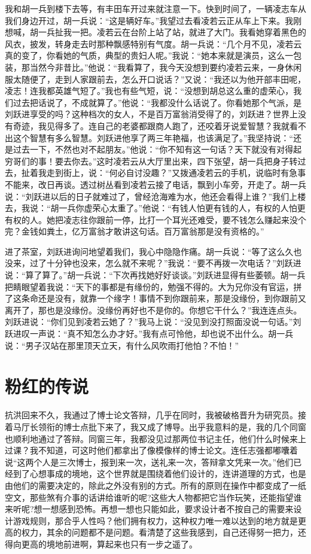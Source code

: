 \documentclass[12pt,oneside]{book}
\begin{document}
我和胡一兵到楼下去等，有丰田车开过来就注意一下。快到时间了，一辆凌志车从我们身边开过，胡一兵说：``这是辆好车。''我望过去看凌若云正从车上下来。我刚想喊，胡一兵扯我一把。凌若云在台阶上站了站，就进了大门。我看她穿着黑色的风衣，披发，转身走去时那种飘感特别有气度。胡一兵说：``几个月不见，凌若云真的变了，你看她的气质，典型的贵妇人呢。''我说：``她本来就是演员，这么一包装，那当然今非昔比。''他说：``我看算了，我今天没想到要约凌若云来，一身休闲服太随便了，走到人家跟前去，怎么开口说话？''又说：``我还以为他开部丰田呢，凌志！连我都英雄气短了。''我也有些气短，说：``没想到胡总这么重的虚荣心，我们过去把话说了，不成就算了。''他说：``我都没什么话说了。你看她那个气派，是刘跃进享受的吗？这种档次的女人，不是百万富翁消受得了的，刘跃进？世界上没有奇迹，我见得多了。连自己的老婆都跟商人跑了，还咬着牙说爱智慧？我就看不出这个智慧有多么智慧。刘跃进他享了两三年艳福，也该满足了。''我坚持说：``还是过去一下，不然也对不起朋友。''他说：``你不知有这一句话？天下就没有对得起穷哥们的事！要去你去。''这时凌若云从大厅里出来，四下张望，胡一兵把身子转过去，扯着我走到街上，说：``何必自讨没趣？''又拨通凌若云的手机，说临时有急事不能来，改日再谈。透过树丛看到凌若云接了电话，飘到小车旁，开走了。胡一兵说：``刘跃进以后的日子就难过了，曾经沧海难为水，他还会看得上谁？''我们上楼去，我说：``胡一兵你虚荣心太重了。''他说：``有钱人怕更有钱的人，有权的人怕更有权的人。她把凌志往你跟前一停，比打一个耳光还难受，要不钱怎么赚起来没个完？金钱如粪土，亿万富翁才敢讲这句话。百万富翁那是没有资格的。''

进了茶室，刘跃进询问地望着我们，我心中隐隐作痛。胡一兵说：``等了这么久也没来，过了十分钟也没来，怎么就不来呢？''我说：``要不再拨一次电话？''刘跃进说：``算了算了。''胡一兵说：``下次再找她好好谈谈。''刘跃进显得有些萎顿。胡一兵把睛眼望着我说：``天下的事都是有缘份的，勉强不得的。大为兄你没有官运，拼了这条命还是没有，就靠一个缘字！事情不到你跟前来，那是没缘份，到你跟前又离开了，那也是没缘份。没缘份再好也不是你的。你想它干什么？''我连连点头。刘跃进说：``你们见到凌若云她了？''我马上说：``没见到没打照面没说一句话。''刘跃进叹一声说：``真不知怎么办才好。''我有点可怜他，却也说不出什么。胡一兵说：``男子汉站在那里顶天立天，有什么风吹雨打他怕？不怕！''


\chapter{粉红的传说}

抗洪回来不久，我通过了博士论文答辩，几乎在同时，我被破格晋升为研究员。接着马厅长领衔的博士点批下来了，我又成了博导。出乎我意料的是，我的几个同窗也顺利地通过了答辩。同窗三年，我都没见过那两位书记主任，他们什么时候来上过课？我不知道，可这时他们都拿出了像模像样的博士论文。连任志强都嘟囔着说``这两个人是三次博士，报到来一次，送礼来一次，答辩拿文凭来一次。''他们已经到了心想事成的境地，这个世界就是围绕着他们设计的，连讲道理的方式，也是由他们的需要决定的，除此之外没有别的方式。所有的原则在操作中都变成了一纸空文，那些煞有介事的话讲给谁听的呢?这些大人物都把它当作玩笑，还能指望谁来听呢?想一想感到恐怖。再想一想也只能如此，要求设计者不按自己的需要来设计游戏规则，那合乎人性吗？他们拥有权力，这种权力唯一难以达到的地方就是更高的权力，其余的问题都不是问题。看清楚了这些我感到，自己还得努一把力，还得向更高的境地前进啊，算起来也只有一步之遥了。
\end{document}
